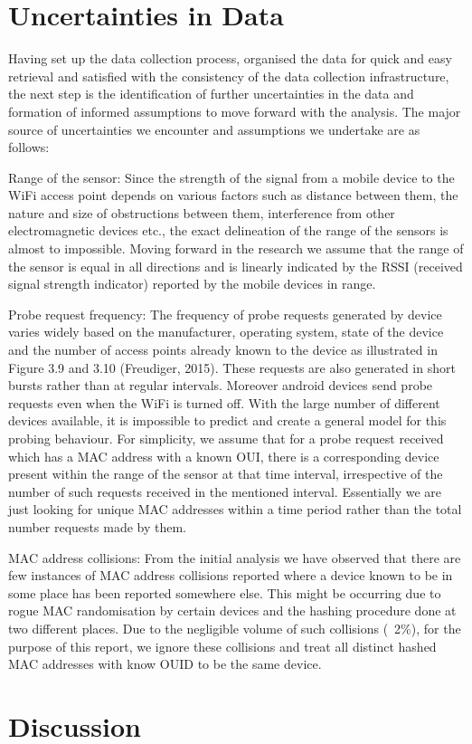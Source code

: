 \section{Uncertainties in Data}

Having set up the data collection process, organised the data for quick and easy retrieval and satisfied with the consistency of the data collection infrastructure, the next step is the identification of further uncertainties in the data and formation of informed assumptions to move forward with the analysis.
The major source of uncertainties we encounter and assumptions we undertake are as follows:

Range of the sensor: Since the strength of the signal from a mobile device to the WiFi access point depends on various factors such as distance between them, the nature and size of obstructions between them, interference from other electromagnetic devices etc., the exact delineation of the range of the sensors is almost to impossible.
Moving forward in the research we assume that the range of the sensor is equal in all directions and is linearly indicated by the RSSI (received signal strength indicator) reported by the mobile devices in range.

Probe request frequency: The frequency of probe requests generated by device varies widely based on the manufacturer, operating system, state of the device and the number of access points already known to the device as illustrated in Figure 3.9 and 3.10 (Freudiger, 2015).
These requests are also generated in short bursts rather than at regular intervals.
Moreover android devices send probe requests even when the WiFi is turned off.
With the large number of different devices available, it is impossible to predict and create a general model for this probing behaviour.
For simplicity, we assume that for a probe request received which has a MAC address with a known OUI, there is a corresponding device present within the range of the sensor at that time interval, irrespective of the number of such requests received in the mentioned interval.
Essentially we are just looking for unique MAC addresses within a time period rather than the total number requests made by them.

MAC address collisions: From the initial analysis we have observed that there are few instances of MAC address collisions reported where a device known to be in some place has been reported somewhere else.
This might be occurring due to rogue MAC randomisation by certain devices and the hashing procedure done at two different places.
Due to the negligible volume of such collisions (~2\%), for the purpose of this report, we ignore these collisions and treat all distinct hashed MAC addresses with know OUID to be the same device.

\section{Discussion}
